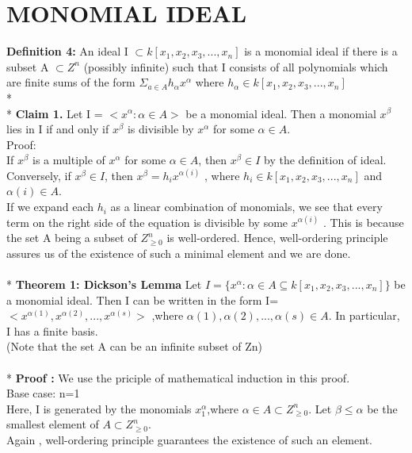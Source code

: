 \documentclass[12pt]{article}
\begin{document}
\section{MONOMIAL IDEAL}
{\bf Definition 4:}
An ideal I $\subset  k[x_{1},x_{2},x_{3},...,x_{n}]$ is a monomial ideal if there is a subset A $\subset  Z^{n}$ (possibly infinite) such that I consists of all polynomials which are finite sums of the form $\Sigma_{a \in A} h_{\alpha}x^{\alpha}$  where $h_{\alpha} \in k[x_{1} ,x_{2} ,x_{3},...,x_{n}]$
\\*
\\*
{\bf Claim 1.}
Let I = $<x^{\alpha}:\alpha \in A>$ be a monomial ideal. Then a monomial $x^{\beta}$ lies in I
if and only if $x^{\beta}$ is divisible by $x^{\alpha}$ for some $\alpha \in A$.
\\
Proof:
\\
If $x^{\beta}$ is a multiple of $x^{\alpha}$ for some $\alpha \in A$, then $x^{\beta} \in I$ by the definition of ideal.
\\
Conversely, if $x^{\beta} \in I$, then $x^{\beta} = h_{i} x^{\alpha(i)}$ , where $h_{i} \in k[x_{1} ,x_{2} ,x_{3},...,x_{n}]$ and $\alpha(i) \in A$.
\\
If we expand each $h_{i}$ as a linear combination of monomials, we see that every term on the right side of the equation is divisible by some $x^{\alpha(i)}$ . This is because the set A being a subset of $Z^{n}_{\geq 0}$ is well-ordered. Hence, well-ordering principle assures us of the existence of such a minimal element and we are done.\\
\\*
{\bf Theorem 1: Dickson’s Lemma} 
Let $I = \{x^{\alpha} : \alpha \in A \subseteq  k[x_{1} ,x_{2} ,x_{3},...,x_{n}]\}$ be a monomial ideal. Then I can be written in the form I=$<x^{\alpha(1)},x^{\alpha(2)},...,x^{\alpha(s)}>$ ,where $\alpha(1),{\alpha(2)},...,{\alpha(s)} \in A$. In particular, I has a finite basis.\\
(Note that the set A can be an infinite subset of Zn)\\\\*
{\bf Proof :}
We use the priciple of mathematical induction in this proof.\\
Base case: n=1\\
Here, I is generated by the monomials $x_{1}^{\alpha}$,where $\alpha \in A \subset Z^{n}_{\geq 0}$. Let $\beta \leq \alpha$ be the smallest element of $A \subset Z^{n}_{\geq 0}$.\\
Again , well-ordering principle guarantees the existence of such an element.\\
\end{document}
